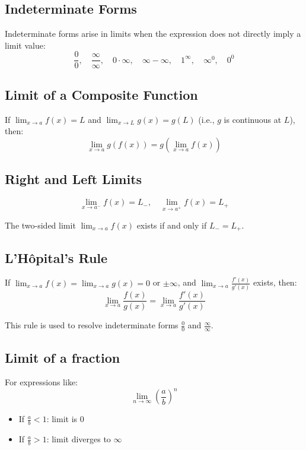 \subsection{Indeterminate Forms}

Indeterminate forms arise in limits when the expression does not directly imply a limit value:
\[
\frac{0}{0}, \quad \frac{\infty}{\infty}, \quad 0 \cdot \infty, \quad \infty - \infty, \quad 1^\infty, \quad \infty^0, \quad 0^0
\]

\subsection{Limit of a Composite Function}

If \(\displaystyle \lim_{x \to a} f(x) = L\) and \(\displaystyle \lim_{x \to L} g(x) = g(L)\) (i.e., \(g\) is continuous at \(L\)), then:
\[
\lim_{x \to a} g(f(x)) = g\left(\lim_{x \to a} f(x)\right)
\]

\subsection{Right and Left Limits}

\[
\lim_{x \to a^-} f(x) = L_-, \quad \lim_{x \to a^+} f(x) = L_+
\]

The two-sided limit \(\displaystyle \lim_{x \to a} f(x)\) exists if and only if \(L_- = L_+\).

\subsection{L’Hôpital’s Rule}

If \(\displaystyle \lim_{x \to a} f(x) = \lim_{x \to a} g(x) = 0\) or \(\pm\infty\), and \(\displaystyle \lim_{x \to a} \frac{f'(x)}{g'(x)}\) exists, then:
\[
\lim_{x \to a} \frac{f(x)}{g(x)} = \lim_{x \to a} \frac{f'(x)}{g'(x)}
\]

This rule is used to resolve indeterminate forms \(\frac{0}{0}\) and \(\frac{\infty}{\infty}\).

\subsection{Limit of a fraction}

For expressions like:
\[
\lim_{n \to \infty} {\left( \frac{a}{b} \right)}^n
\]
\begin{itemize}[label=\(-\)]
\item If \(\frac{a}{b} < 1\): limit is \(0\)
\item If \(\frac{a}{b} > 1\): limit diverges to \(\infty\)
\end{itemize}

